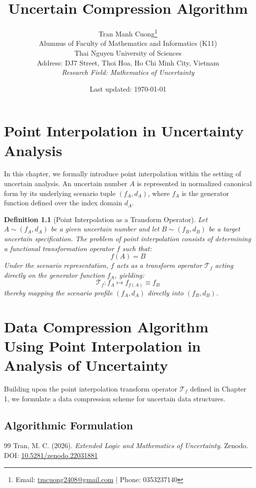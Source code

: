 \documentclass[a4paper,14pt, twoside]{memoir}
\title{\textbf{Uncertain Compression Algorithm}}
\author{
	Tran Manh Cuong\thanks{Email: \href{mailto:tmcuong2408@gmail.com}{tmcuong2408@gmail.com} | Phone: 0353237140} \\[0.5em]
	\small Alumnus of Faculty of Mathematics and Informatics (K11)
	\\ Thai Nguyen University of Sciences \\
	\small Address: DJ7 Street, Thoi Hoa, Ho Chi Minh City, Vietnam \\
	\small \textit{Research Field: Mathematics of Uncertainty}
}
\date{Last updated: \today}
\newtheorem{definition}{Definition}[chapter]
\begin{document}
\maketitle

\chapter{Point Interpolation in Uncertainty Analysis}

In this chapter, we formally introduce point interpolation within the setting of uncertain analysis. An uncertain number $A$ is represented in normalized canonical form by its underlying scenario tuple $(f_A, d_A)$, where $f_A$ is the generator function defined over the index domain $d_A$.

\begin{definition}[Point Interpolation as a Transform Operator]
	Let $A \sim (f_A, d_A)$ be a given uncertain number and let $B \sim (f_B, d_B)$ be a target uncertain specification. The problem of point interpolation consists of determining a functional transformation operator $f$ such that:
	\begin{equation}
		f(A) = B
	\end{equation}
	Under the scenario representation, $f$ acts as a transform operator $\mathcal{T}_f$ acting directly on the generator function $f_A$, yielding:
	\begin{equation}
		\mathcal{T}_f : f_A \mapsto f_{f(A)} \equiv f_B
	\end{equation}
	thereby mapping the scenario profile $(f_A, d_A)$ directly into $(f_B, d_B)$.
\end{definition}


\chapter{Data Compression Algorithm Using Point Interpolation in Analysis of Uncertainty}

Building upon the point interpolation transform operator $\mathcal{T}_f$ defined in Chapter 1, we formulate a data compression scheme for uncertain data structures.

\section{Algorithmic Formulation}



\begin{thebibliography}{99}
	Tran, M. C. (2026). \textit{Extended Logic and Mathematics of Uncertainty}. Zenodo. DOI:
	\href{https://doi.org/10.5281/zenodo.22031881}{10.5281/zenodo.22031881}
\end{thebibliography}
\end{document}
